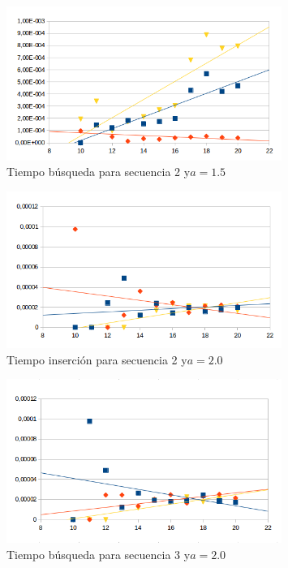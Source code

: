 \documentclass[letterpaper,12pt]{article}
\begin{document}
\begin{figure}[bp!]
  \centering
    \includegraphics[width=0.8\textwidth]{freq215_busq}
  \caption{Tiempo b\'usqueda para secuencia 2 y$a=1.5$}
  \label{fig:f4}
\end{figure}

\begin{figure}[bp!]
  \centering
    \includegraphics[width=0.8\textwidth]{freq320_ins}
  \caption{Tiempo inserci\'on para secuencia 2 y$a=2.0$}
  \label{fig:f5}
\end{figure}

\begin{figure}[bp!]
  \centering
    \includegraphics[width=0.8\textwidth]{freq320_busq}
  \caption{Tiempo b\'usqueda para secuencia 3 y$a=2.0$}
  \label{fig:f6}
\end{figure}
\fi
\newpage
\end{document}
